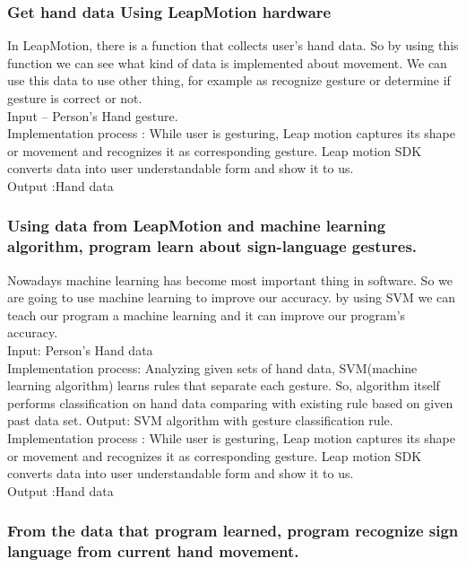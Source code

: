 \documentclass[10pt,journal,compsoc]{IEEEtran}
\begin{document}
\subsubsection{Get hand data Using LeapMotion hardware}

In LeapMotion, there is a function that collects user’s hand data. So by using this function we can see what kind of data is implemented about movement. 
We can use this data to use other thing, for example as recognize gesture or determine if gesture is correct or not.
\\Input – Person's Hand gesture.
\\Implementation process : While user is gesturing, Leap motion captures its shape or movement and recognizes it as corresponding gesture. Leap motion SDK converts data into user understandable form and show it to us.
\\Output :Hand data
\subsubsection{Using data from LeapMotion and machine learning algorithm, program learn about sign-language gestures.}

Nowadays machine learning has become most important thing in software. So we are going to use machine learning to improve our accuracy. by using SVM we can teach our program a machine learning and it can improve our program’s accuracy.
\\Input: Person's Hand data
\\Implementation process: Analyzing given sets of hand data, SVM(machine learning algorithm) learns rules that separate each gesture. So, algorithm itself performs classification on hand data comparing with existing rule based on given past data set.
Output: SVM algorithm with gesture classification rule.
\\Implementation process : While user is gesturing, Leap motion captures its shape or movement and recognizes it as corresponding gesture. Leap motion SDK converts data into user understandable form and show it to us.
\\Output :Hand data
\subsubsection{From the data that program learned, program recognize sign language from current hand movement.}
\end{document}
